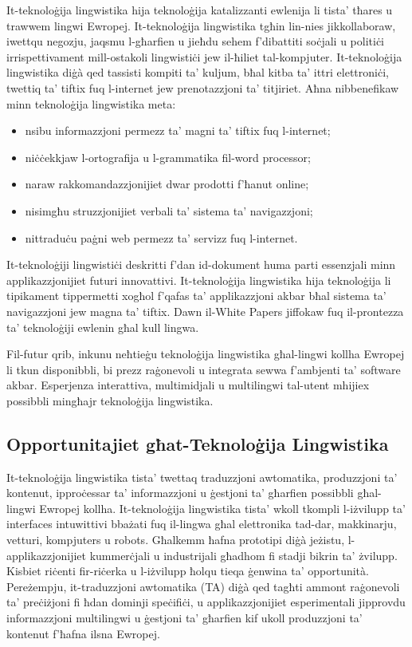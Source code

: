 \begin{multicols}{2}
It-teknoloġija lingwistika hija teknoloġija katalizzanti ewlenija li tista’ tħares u trawwem lingwi Ewropej. It-teknoloġija lingwistika tgħin lin-nies jikkollaboraw, iwettqu negozju, jaqsmu l-għarfien u jieħdu sehem f’dibattiti soċjali u politiċi irrispettivament mill-ostakoli lingwistiċi jew il-ħiliet tal-kompjuter. It-teknoloġija lingwistika diġà qed tassisti kompiti ta’ kuljum, bħal kitba ta’ ittri elettroniċi, twettiq ta’ tiftix fuq l-internet jew prenotazzjoni ta’ titjiriet. Aħna nibbenefikaw minn teknoloġija lingwistika meta:

\begin{itemize}
\item nsibu informazzjoni permezz ta’ magni ta’ tiftix fuq l-internet; 
\item niċċekkjaw l-ortografija u l-grammatika fil-word processor;
\item naraw rakkomandazzjonijiet dwar prodotti f’ħanut online;
\item nisimgħu struzzjonijiet verbali ta’ sistema ta’ navigazzjoni;
\item nittraduċu paġni web permezz ta’ servizz fuq l-internet.
\end{itemize}

It-teknoloġiji lingwistiċi deskritti f'dan id-dokument huma parti essenzjali minn applikazzjonijiet futuri innovattivi. It-teknoloġija lingwistika hija teknoloġija li tipikament tippermetti xogħol f'qafas ta’ applikazzjoni akbar bħal sistema ta’ navigazzjoni jew magna ta’ tiftix. Dawn il-White Papers jiffokaw fuq il-prontezza ta’ teknoloġiji ewlenin għal kull lingwa.

  
Fil-futur qrib, inkunu neħtieġu teknoloġija lingwistika għal-lingwi kollha Ewropej li tkun disponibbli, bi prezz raġonevoli u integrata sewwa f’ambjenti ta’ software akbar. Esperjenza interattiva, multimidjali u multilingwi tal-utent mhijiex possibbli mingħajr teknoloġija lingwistika.

\subsection{Opportunitajiet għat-Teknoloġija Lingwistika}

It-teknoloġija lingwistika tista’ twettaq traduzzjoni awtomatika, produzzjoni ta’ kontenut, ipproċessar ta’ informazzjoni u ġestjoni ta’ għarfien possibbli għal-lingwi Ewropej kollha. It-teknoloġija lingwistika tista’ wkoll tkompli l-iżvilupp ta’ interfaces intuwittivi bbażati fuq il-lingwa għal elettronika tad-dar, makkinarju, vetturi, kompjuters u robots. Għalkemm ħafna prototipi diġà jeżistu, l-applikazzjonijiet kummerċjali u industrijali għadhom fi stadji bikrin ta’ żvilupp. Kisbiet riċenti fir-riċerka u l-iżvilupp ħolqu tieqa ġenwina ta’ opportunità. Pereżempju, it-traduzzjoni awtomatika (TA) diġà qed tagħti ammont raġonevoli ta’ preċiżjoni fi ħdan dominji speċifiċi, u applikazzjonijiet esperimentali jipprovdu informazzjoni multilingwi u ġestjoni ta’ għarfien kif ukoll produzzjoni ta’ kontenut f’ħafna ilsna Ewropej.


\end{multicols}
